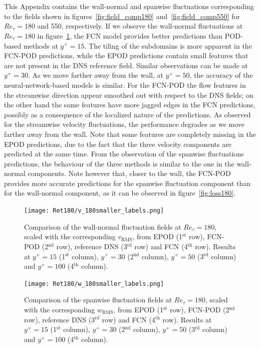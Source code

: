 \section{}\label{appA}
This Appendix contains the wall-normal and spanwise fluctuations corresponding to the fields shown in figures~\ref{fig:field_comp180} and~\ref{fig:field_comp550} for $Re_{\tau}=180$ and 550, respectively.
If we observe the wall-normal fluctuations at $Re_{\tau}=180$ in figure~\ref{fig:field_comp180v}, the FCN model provides better predictions than POD-based methods at $y^+=15$.
The tiling of the subdomains is more apparent in the FCN-POD predictions, while the EPOD predictions contain small features that are not present in the DNS reference field.
Similar observations can be made at $y^+=30$.
As we move farther away from the wall, at $y^+=50$, the accuracy of the neural-network-based models is similar.
For the FCN-POD the flow features in the streamwise direction appear smoothed out with respect to the DNS fields; on the other hand the same features have more jagged edges in the FCN predictions, possibly as a consequence of the localized nature of the predictions.
As observed for the streamwise velocity fluctuations, the performance degrades as we move farther away from the wall.
Note that some features are completely missing in the EPOD predictions, due to the fact that the three velocity components are predicted at the same time.
From the observation of the spanwise fluctuations predictions, the behaviour of the three methods is similar to the one in the wall-normal components.
Note however that, closer to the wall, the FCN-POD provides more accurate predictions for the spanwise fluctuation component than for the wall-normal component, as it can be observed in figure~\ref{fig:loss180}.

\begin{figure}
\begin{center}
\texttt{[image: Ret180/v\_180smaller\_labels.png]}
\end{center}
\caption{\label{fig:field_comp180v} Comparison of the wall-normal fluctuation fields at $Re_{\tau} = 180$, scaled with the corresponding $v_\mathrm{RMS}$, from EPOD (1$^{\text{st}}$ row), FCN-POD (2$^{\text{nd}}$ row), reference DNS (3$^{\text{rd}}$ row) and FCN (4$^{\text{th}}$ row). Results at $y^+=15$ (1$^{\text{st}}$ column), $y^+=30$ (2$^{\text{nd}}$ column), $y^+=50$ (3$^{\text{rd}}$ column) and $y^+=100$ (4$^{\text{th}}$ column).}
\end{figure}

\begin{figure}
\begin{center}
\texttt{[image: Ret180/w\_180smaller\_labels.png]}
\end{center}
\caption{\label{fig:field_comp180w} Comparison of the spanwise fluctuation fields at $Re_{\tau} = 180$, scaled with the corresponding $w_\mathrm{RMS}$, from EPOD (1$^{\text{st}}$ row), FCN-POD (2$^{\text{nd}}$ row), reference DNS (3$^{\text{rd}}$ row) and FCN (4$^{\text{th}}$ row). Results at $y^+=15$ (1$^{\text{st}}$ column), $y^+=30$ (2$^{\text{nd}}$ column), $y^+=50$ (3$^{\text{rd}}$ column) and $y^+=100$ (4$^{\text{th}}$ column).}
\end{figure}

